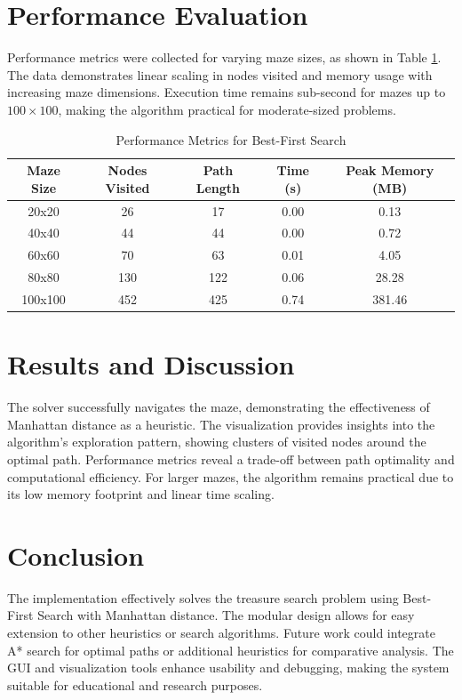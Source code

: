 \documentclass{report}
\begin{document}
\section{Performance Evaluation}
Performance metrics were collected for varying maze sizes, as shown in Table \ref{tab:performance}. The data demonstrates linear scaling in nodes visited and memory usage with increasing maze dimensions. Execution time remains sub-second for mazes up to $100 \times 100$, making the algorithm practical for moderate-sized problems.

\begin{table}[h]
	\centering
	\caption{Performance Metrics for Best-First Search}
	\label{tab:performance}
	\begin{tabular}{ccccc}
		\toprule
		\textbf{Maze Size} & \textbf{Nodes Visited} & \textbf{Path Length} & \textbf{Time (s)} & \textbf{Peak Memory (MB)} \\
		\midrule
		20x20 & 26 & 17 & 0.00 & 0.13 \\
		40x40 & 44 & 44 & 0.00 & 0.72 \\
		60x60 & 70 & 63 & 0.01 & 4.05 \\
		80x80 & 130 & 122 & 0.06 & 28.28 \\
		100x100 & 452 & 425 & 0.74 & 381.46 \\
		\bottomrule
	\end{tabular}
\end{table}

\section{Results and Discussion}
The solver successfully navigates the maze, demonstrating the effectiveness of Manhattan distance as a heuristic. The visualization provides insights into the algorithm's exploration pattern, showing clusters of visited nodes around the optimal path. Performance metrics reveal a trade-off between path optimality and computational efficiency. For larger mazes, the algorithm remains practical due to its low memory footprint and linear time scaling.

\section{Conclusion}
The implementation effectively solves the treasure search problem using Best-First Search with Manhattan distance. The modular design allows for easy extension to other heuristics or search algorithms. Future work could integrate A* search for optimal paths or additional heuristics for comparative analysis. The GUI and visualization tools enhance usability and debugging, making the system suitable for educational and research purposes.
\end{document}

